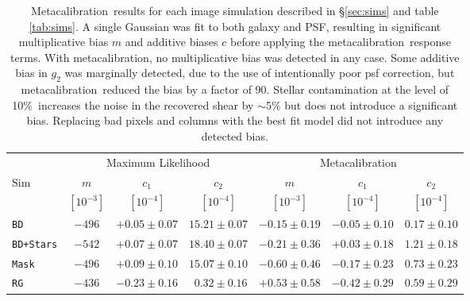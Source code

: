 \documentclass[usegraphicx,usenatbib]{mn2e}
\newcommand{\mcal}{metacalibration}
\newcommand{\Mcal}{Metacalibration}
\newcommand{\nsimNstarperc}{10\%}
\newcommand{\bdsim}{\texttt{BD}}
\newcommand{\bdstar}{\texttt{BD+Stars}}
\newcommand{\bdmask}{\texttt{Mask}}
\newcommand{\rgsim}{\texttt{RG}}
\newcommand{\pimprovement}{90}
\begin{document}
\begin{table}
    \centering
    \caption{\Mcal\ results for each image simulation described in
        \S \ref{sec:sims} and table \ref{tab:sims}.  A single Gaussian was fit
    to both galaxy and PSF, resulting in significant multiplicative 
    bias $m$ and additive biases $c$ before applying the \mcal\ response
    terms. With \mcal, no multiplicative bias was detected in any case. 
    Some additive bias in $g_2$ was marginally detected, due to the use of
    intentionally poor psf correction, but \mcal\ reduced the
    bias by a factor of \pimprovement.
    Stellar contamination at the level of \nsimNstarperc\ increases
    the noise in the recovered shear by $\sim$5\% but does not introduce 
    a significant bias.  Replacing bad pixels and columns with the best fit model
    did not introduce any detected bias.
    \label{tab:results}}
    \begin{tabular}{ |l|  c|c|c|  c|c|c|}
        \hline
        & \multicolumn{3}{c}{Maximum Likelihood}                    & \multicolumn{3}{c}{\Mcal} \\
        Sim    & $m$         & $c_1$            & $c_2$             & $m$               & $c_1$            & $c_2$ \\
               & $[10^{-3}]$ & $[10^{-4}]$      & $[10^{-4}]$       & $[10^{-3}]$       & $[10^{-4}]$      & $[10^{-4}]$ \\
        \hline
        \bdsim & $-496$      & $+0.05 \pm 0.07$ & $ 15.21 \pm 0.07$ & $-0.15 \pm 0.19$  & $-0.05 \pm 0.10$ & $0.17 \pm 0.10$  \\
        \bdstar& $-542$      & $+0.07 \pm 0.07$ & $ 18.40 \pm 0.07$ & $-0.21 \pm 0.36$  & $+0.03 \pm 0.18$ & $1.21 \pm 0.18$  \\
        \bdmask& $-496$      & $+0.09 \pm 0.10$ & $ 15.07 \pm 0.10$ & $-0.60 \pm 0.46$  & $-0.17 \pm 0.23$ & $0.73 \pm 0.23$  \\
        \rgsim & $-436$      & $-0.23 \pm 0.16$ & $~~0.32 \pm 0.16$ & $+0.53 \pm 0.58$  & $-0.42 \pm 0.29$ & $0.59 \pm 0.29$ \\
    \end{tabular}
\end{table}
\end{document}

